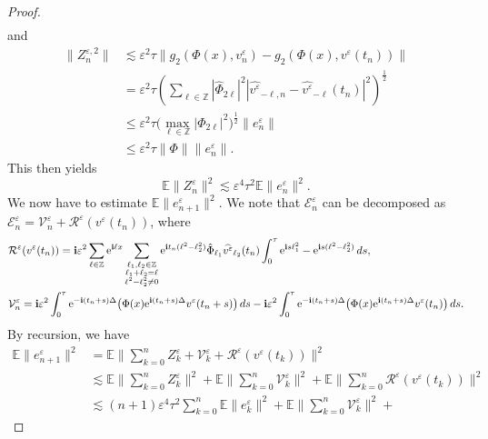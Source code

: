 \documentclass[a4paper]{amsart}
\begin{document}
\begin{proof}
\begin{align*}
\end{align*}
and
\begin{align*}
    \|Z_n^{\varepsilon,2}\|&\lesssim \varepsilon^{2} \tau \|g_2(\Phi(x),v^\varepsilon_n)-g_2(\Phi(x),v^\varepsilon(t_n))\|\\
    &= \varepsilon^{2} \tau  (\sum_{\ell\in\mathbb{Z}}|\hat{\Phi}_{2\ell}|^2 |\widehat{v^\varepsilon}_{-\ell,n}-\widehat{v^\varepsilon}_{-\ell}(t_n)|^2)^{\frac{1}{2}}\\
    &\le \varepsilon^{2}\tau \big(\max_{\ell\in\mathbb{Z}}|\Phi_{2\ell}|^2\big)^{\frac{1}{2}} \|e^\varepsilon_n\|\\
    &\le  \varepsilon^{2}\tau \|\Phi\| \|e^\varepsilon_n\|.
\end{align*}
This then yields
$$
\mathbb{E}\|Z^\varepsilon_n\|^{2}\lesssim \varepsilon^{4} \tau^{2} \mathbb{E}\|e^\varepsilon_n\|^{2}.
$$
We now have to estimate $\mathbb{E}\|e^\varepsilon_{n+1}\|^2.$ We note that $\mathcal{E}^\varepsilon_n$ can be decomposed as
$\mathcal{E}^\varepsilon_n=\mathcal{V}^\varepsilon_n+\mathcal{R}^\varepsilon(v^\varepsilon(t_n))$, where
\begin{align*}
&\mathcal{R}^\varepsilon(v^\varepsilon(t_n))={\bf i}\varepsilon^2 \displaystyle\sum_{\ell\in\mathbb{Z}}{\rm e}^{{\bf i}\ell x}\displaystyle\sum_{\substack{\ell_1,\ell_2\in\mathbb{Z}\\ \ell_1+\ell_2=\ell\\\ell^2-\ell_2^2\ne 0}}{\rm e}^{{\bf i}t_n (\ell^2-\ell_2^2)}\hat{\Phi}_{\ell_1}\widehat{v^\varepsilon}_{\ell_2}(t_n)\int_{0}^{\tau}{\rm e}^{{\bf i}s \ell_1^2}-{\rm e}^{{\bf i}s(\ell^2-\ell_2^2)}\,ds,\\
&\mathcal{V}_n^\varepsilon={\bf i}\varepsilon^2 \int_{0}^{\tau} {\rm e}^{-{\bf i}(t_n+s)\Delta} \big(\Phi(x){\rm e}^{{\bf i}(t_n+s)\Delta} v^\varepsilon(t_n+s)\big)\,ds-{\bf i}\varepsilon^2 \int_{0}^{\tau} {\rm e}^{-{\bf i}(t_n+s)\Delta} \big(\Phi(x){\rm e}^{{\bf i}(t_n+s)\Delta} v^\varepsilon(t_n)\big)\,ds.
\end{align*}
By recursion, we have
\begin{align*}
\mathbb{E}\|e^\varepsilon_{n+1}\|^{2}&=\mathbb{E}\|\sum_{k=0}^n Z^\varepsilon_k+\mathcal{V}^\varepsilon_k+\mathcal{R}^\varepsilon(v^\varepsilon(t_k))\|^{2}\\
&\lesssim \mathbb{E}\|\sum_{k=0}^n Z^\varepsilon_k\|^{2}+\mathbb{E}\|\sum_{k=0}^n \mathcal{V}^\varepsilon_k\|^{2}
+\mathbb{E}\|\sum_{k=0}^n \mathcal{R}^\varepsilon(v^\varepsilon(t_k))\|^{2}\\
&\lesssim (n+1)\varepsilon^{4} \tau^{2}\sum_{k=0}^{n}\mathbb{E}\|e^\varepsilon_k\|^{2}+\mathbb{E}\|\sum_{k=0}^n \mathcal{V}^\varepsilon_k\|^{2}+

\end{align*}
\end{proof}
\end{document}

